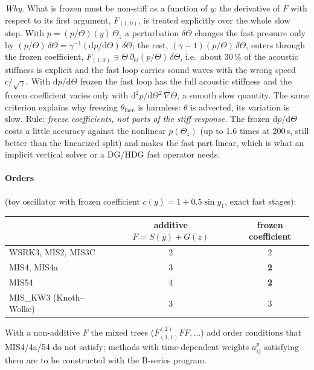 \documentclass[11pt,a4paper]{article}
\begin{document}
\emph{Why.} What is frozen must be non-stiff as a function of $y$: the derivative of $F$ with respect
to its first argument, $F_{(1,0)}$, is treated explicitly over the whole slow step. With
$p=(p/\Theta)(y)\,\Theta_z$ a perturbation $\delta\Theta$ changes the fast pressure only by
$(p/\Theta)\,\delta\Theta=\gamma^{-1}(\mathrm dp/\mathrm d\Theta)\,\delta\Theta$; the rest,
$(\gamma-1)(p/\Theta)\,\delta\Theta$, enters through the frozen coefficient,
$F_{(1,0)}\ni\Theta\,\partial_\Theta(p/\Theta)\,\delta\Theta$, i.e.\ about 30\,\% of the acoustic
stiffness is explicit and the fast loop carries sound waves with the wrong speed $c/\sqrt\gamma$.
With $\mathrm dp/\mathrm d\Theta$ frozen the fast loop has the full acoustic stiffness and the
frozen coefficient varies only with $\mathrm d^2p/\mathrm d\Theta^2\,\nabla\Theta$, a smooth slow
quantity. The same criterion explains why freezing $\theta_\mathrm{face}$ is harmless: $\theta$ is
advected, its variation is slow. Rule: \emph{freeze coefficients, not parts of the stiff response.}
The frozen $\mathrm dp/\mathrm d\Theta$ costs a little accuracy against the nonlinear $p(\Theta_z)$
(up to 1.6 times at 200\,s, still better than the linearized split) and makes the fast part linear,
which is what an implicit vertical solver or a DG/HDG fast operator needs.

\paragraph{Orders} (toy oscillator with frozen coefficient $c(y)=1+0.5\sin y_1$, exact fast stages):
\begin{center}
\begin{tabular}{lcc}
\toprule
 & additive $F=S(y)+G(z)$ & frozen coefficient\\
\midrule
WSRK3, MIS2, MIS3C & 2 & 2\\
MIS4, MIS4a & 3 & \textbf{2}\\
MIS54 & 4 & \textbf{2}\\
MIS\_KW3 (Knoth--Wolke) & 3 & 3\\
\bottomrule
\end{tabular}
\end{center}
With a non-additive $F$ the mixed trees ($F^{(2)}_{(1,1)}FF,\dots$) add order conditions that
MIS4/4a/54 do not satisfy; methods with time-dependent weights $a_{ij}^p$ satisfying them are to be
constructed with the B-series program.
\end{document}
